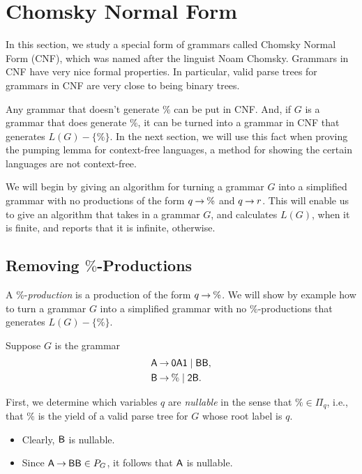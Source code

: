 \section{Chomsky Normal Form}
\label{ChomskyNormalForm}

In this section, we study a special form of grammars called Chomsky
Normal Form (CNF), which was named after the linguist Noam Chomsky.
Grammars in CNF have very nice formal properties.  In particular,
valid parse trees for grammars in CNF are very close to being binary
trees.

Any grammar that doesn't generate $\%$ can be put in CNF.  And, if $G$
is a grammar that does generate $\%$, it can be turned into a grammar
in CNF that generates $L(G)-\{\%\}$.  In the next section, we will use
this fact when proving the pumping lemma for context-free languages, a
method for showing the certain languages are not context-free.

We will begin by giving an algorithm for turning a grammar $G$ into a
simplified grammar with no productions of the form $q\mathbin{\to}\%$ and
$q\mathbin{\to} r$. This will enable us to give an algorithm that takes in a
grammar $G$, and calculates $L(G)$, when it is finite, and reports
that it is infinite, otherwise.

\subsection{Removing $\%$-Productions}

A $\%$-\emph{production} is a production of the form $q\mathbin{\to}\%$.  We
will show by example how to turn a grammar $G$ into a simplified
grammar with no $\%$-productions that generates $L(G)-\{\%\}$.

Suppose $G$ is the grammar
\begin{align*}
\mathsf{A} &\mathbin{\to} \mathsf{0A1} \mid \mathsf{BB} , \\
\mathsf{B} &\mathbin{\to} \% \mid \mathsf{2B} .
\end{align*}

First, we determine which variables $q$ are \emph{nullable} in the
sense that $\%\in\Pi_q$, i.e., that $\%$ is the yield of a valid parse
tree for $G$ whose root label is $q$.
\begin{itemize}
\item Clearly, $\mathsf{B}$ is nullable.

\item Since $\mathsf{A}\mathbin{\to}\mathsf{B}\mathsf{B}\in P_G$, it follows that $\mathsf{A}$ is
  nullable.
\end{itemize}

